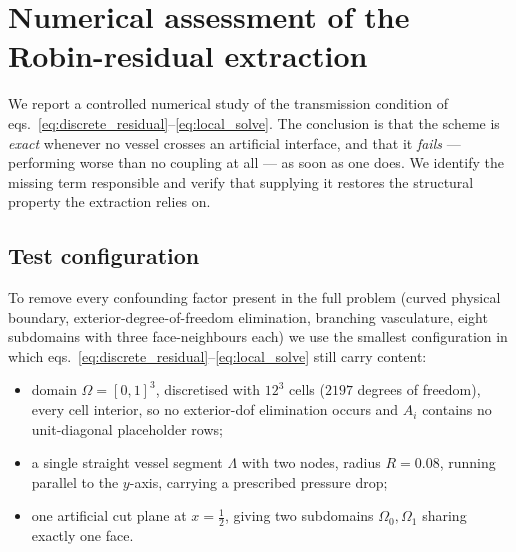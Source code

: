%
%

\section{Numerical assessment of the Robin-residual extraction}
\label{sec:robin-residual-assessment}

We report a controlled numerical study of the transmission condition of
eqs.~\eqref{eq:discrete_residual}--\eqref{eq:local_solve}. The conclusion is that the
scheme is \emph{exact} whenever no vessel crosses an artificial interface, and
that it \emph{fails} --- performing worse than no coupling at all --- as soon as
one does. We identify the missing term responsible and verify that supplying it
restores the structural property the extraction relies on.

\subsection{Test configuration}

To remove every confounding factor present in the full problem (curved physical
boundary, exterior-degree-of-freedom elimination, branching vasculature, eight
subdomains with three face-neighbours each) we use the smallest configuration in
which eqs.~\eqref{eq:discrete_residual}--\eqref{eq:local_solve} still carry content:

\begin{itemize}
  \item domain $\Omega = [0,1]^3$, discretised with $12^3$ cells
        ($2197$ degrees of freedom), every cell interior, so no
        exterior-dof elimination occurs and $A_i$ contains no
        unit-diagonal placeholder rows;
  \item a single straight vessel segment $\Lambda$ with two nodes, radius
        $R = 0.08$, running parallel to the $y$-axis, carrying a prescribed
        pressure drop;
  \item one artificial cut plane at $x = \tfrac12$, giving two subdomains
        $\Omega_0, \Omega_1$ sharing exactly one face.
\end{itemize}

